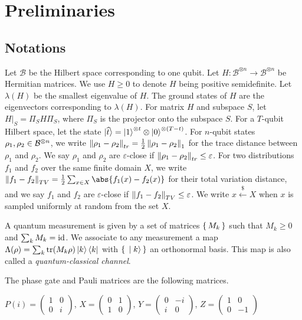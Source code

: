 \section{Preliminaries}


\subsection{Notations}

Let $\mathcal{B}$ be the Hilbert space corresponding to one qubit. Let $H:\mathcal{B}^{\otimes n}\rightarrow\mathcal{B}^{\otimes n}$ be Hermitian matrices. We use $H\geq0$ to denote $H$ being positive semidefinite. Let $\lambda(H)$ be the smallest eigenvalue of $H$. The ground states of $H$ are the eigenvectors corresponding to $\lambda(H)$. For matrix $H$ and subspace $S$, let $H\big|_S=\Pi_S H \Pi_S$, where $\Pi_S$ is the projector onto the subspace $S$. For a $T$-qubit Hilbert space, let the state $\ket{\widehat{t}}=\ket{1}^{\otimes t}\otimes \ket{0}^{{\otimes (T-t)}}$.
For $n$-qubit states $\rho_1, \rho_2\in\mathcal{B}^{\otimes n}$,
we write $\left\lVert\rho_1-\rho_2\right\rVert_{tr}=\frac{1}{2}\left\lVert\rho_1-\rho_2\right\rVert_1$ for the trace distance between $\rho_1$ and $\rho_2$. We say $\rho_1$ and $\rho_2$ are $\varepsilon$-close if $\left\lVert\rho_1- \rho_2\right\rVert_{tr}\leq\varepsilon$.
For two distributions $f_1$ and $f_2$ over the same finite domain $X$, we write $\norm{f_1-f_2}_{TV}=\frac{1}{2}\sum_{x\in X}\abs{f_1(x)-f_2(x)}$ for their total variation distance,
and we say $f_1$ and $f_2$ are $\varepsilon$-close if $\left\lVert f_1-f_2\right\rVert_{TV}\leq\varepsilon$.
We write $x\xleftarrow{\$}X$ when $x$ is sampled uniformly at random from the set $X$.

\begin{definition} 
	\label{def:QCChannel}
	A quantum measurement is given by a set of matrices $\set{M_k}$ such that $M_k\geq0$ and $\sum_k M_k=\operatorname{id}$.
	We associate to any measurement a map $\Lambda(\rho)=\sum_k \operatorname{tr}(M_k\rho)\ket{k}\bra{k}$
	with $\set{\ket{k}}$ an orthonormal basis.
	This map is also called a \emph{quantum-classical channel}.
\end{definition}

The phase gate and Pauli matrices are the following matrices.

\begin{definition}
	$P(i)=\begin{pmatrix}1&0\\0&i\end{pmatrix}$,
	$X=\begin{pmatrix}0&1\\1&0\end{pmatrix}$,
	$Y=\begin{pmatrix}0&-i\\i&0\end{pmatrix}$,
	$Z=\begin{pmatrix}1&0\\0&-1\end{pmatrix}$
\end{definition}

